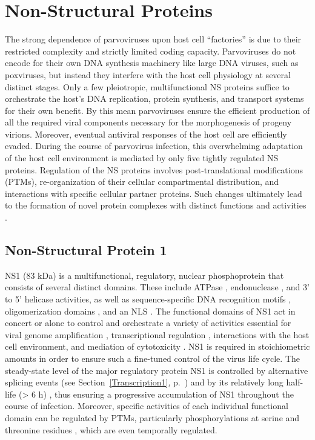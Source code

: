                 

\section{Non-Structural Proteins}
\label{NS}

The strong dependence of parvoviruses upon host cell “factories” is due to their restricted complexity and strictly limited coding capacity. Parvoviruses do not encode for their own DNA synthesis machinery like large DNA viruses, such as poxviruses, but instead they interfere with the host cell physiology at several distinct stages. Only a few pleiotropic, multifunctional NS proteins suffice to orchestrate the host’s DNA replication, protein synthesis, and transport systems for their own benefit. By this mean parvoviruses ensure the efficient production of all the required viral components necessary for the morphogenesis of progeny virions. Moreover, eventual antiviral responses of the host cell are efficiently evaded. During the course of parvovirus infection, this overwhelming adaptation of the host cell environment is mediated by only five tightly regulated NS proteins. Regulation of the NS proteins involves post-translational modifications (PTMs), re-organization of their cellular compartmental distribution, and interactions with specific cellular partner proteins. Such changes ultimately lead to the formation of novel protein complexes with distinct functions and activities \cite{NS}.        


\subsection{Non-Structural Protein 1}
\label{NS1}
NS1 (83 kDa) is a multifunctional, regulatory, nuclear phosphoprotein that consists of several distinct domains. These include ATPase \cite{pmid1833878}, endonuclease \cite{pmid12050365, pmid2527311, pmid7747462, pmid9349487}, and 3' to 5' helicase \cite{pmid8106366} activities, as well as sequence-specific DNA recognition motifs \cite{pmid9813208, pmid7853501, pmid17898054}, oligomerization domains \cite{pmid9311818}, and an NLS \cite{pmid8372437}. The functional domains of NS1 act in concert or alone to control and orchestrate a variety of activities essential for viral genome amplification \cite{pmid1388310, pmid8437230, pmid8076610}, transcriptional regulation \cite{pmid3171551, pmid1830114, pmid9454706}, interactions with the host cell environment, and mediation of cytotoxicity \cite{pmid2137660, pmid2167840, pmid1388209, pmid2144594}. NS1 is required in stoichiometric amounts in order to ensure such a fine-tuned control of the virus life cycle. The steady-state level of the major regulatory protein NS1 is controlled by alternative splicing events (see Section~\ref{Transcription1}, p.~\pageref{Transcription1}) and by its relatively long half-life (> 6 h) \cite{pmid2142555, pmid11437668}, thus ensuring  a progressive accumulation of NS1 throughout the course of infection. Moreover, specific activities of each individual functional domain can be regulated by PTMs, particularly phosphorylations at serine and threonine residues \cite{pmid4020958, pmid3739422}, which are even temporally regulated.

